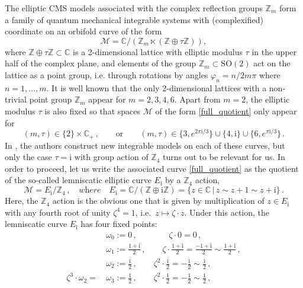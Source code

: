 \documentclass{article}
\def \om {\omega}
\def \Zs {\mathbb{Z}}
\def \Cs {\mathbb{C}}
\begin{document}
The elliptic CMS models associated with the complex reflection groups $\Zs_m$ form a family 
of quantum mechanical integrable systems with (complexified) coordinate on an orbifold 
curve of the form 
\begin{equation}
\mathcal{M} =  \Cs / \left(\Zs_m \ltimes (\Zs \oplus \tau \Zs)\right),
\label{full_quotient}
\end{equation}
where $\Zs \oplus \tau \Zs \subset \Cs$ is a 2-dimensional lattice with elliptic modulus 
$\tau$ in the upper half of the complex plane, and elements of the 
group $\Zs_m \subset \mathrm{SO}(2)$ act on the lattice as a point group, i.e. through 
rotations by angles $\varphi_n = n/2m\pi$ where $n=1,\dots,m$. It is well known that 
the only 2-dimensional lattices with a non-trivial point group $\mathbb{Z}_m$ appear 
for $m=2,3,4,6$. Apart from $m=2$, the elliptic modulus $\tau$ is also fixed so that 
spaces $\mathcal{M}$ of the form 
\eqref{full_quotient} only appear for 
\begin{equation}
(m,\tau) \in \{2\} \times \Cs_+\,, \qquad \mathrm{or} \qquad (m,\tau) \in 
\{3, e^{2 \pi \mathrm{i} /3}\} \cup \{4, \mathrm{i}\} \cup \{6, e^{\pi \mathrm{i} /3}\}\,. 
\end{equation}
In \cite{etingof2011107}, the authors construct new integrable models on each of these 
curves, but only the case $\tau = \mathrm{i}$ with group action of $\mathbb{Z}_4$ 
turns out to be relevant for us. In order to proceed, let us write the associated curve 
\eqref{full_quotient} as the quotient of the so-called lemniscatic elliptic curve 
$E_\mathrm{i}$ by a $\Zs_4$ action, 
\begin{equation}
\mathcal{M} = E_{\mathrm{i}}/\Zs_4\,, \quad \textit{where}\quad  E_{\mathrm{i}} = \Cs/(\Zs \oplus \mathrm{i} \Zs) 
= \{ z \in \Cs \,\vert\, z \sim z+1\sim z+\mathrm{i} \}\,.  
\end{equation}
Here, the $\Zs_4$ action is the obvious one that is given by multiplication of $z
\in E_{\mathrm{i}}$ with any fourth root of unity $\zeta^4 =1$, i.e.\ $z \mapsto \zeta \cdot z$. 
Under this action, the lemniscatic curve $E_\mathrm{i}$ has four fixed points:
\begin{align}
   & \om_0 := 0\,, \qquad \quad \,\,\,\,\, \zeta \cdot 0 = 0\,, \\
   & \om_1 := \frac{1+\mathrm{i}}{2}\,,\qquad \zeta \cdot \frac{1+\mathrm{i}}{2} = \frac{-1+\mathrm{i}}{2} \sim \frac{1+\mathrm{i}}{2}\,, \\
& \om_2 := \frac{\mathrm{i}}{2}\,, \qquad \zeta^2 \cdot \frac{\mathrm{i}}{2} = -\frac{\mathrm{i}}{2} \sim \frac{\mathrm{i}}{2}\, , \\
 \zeta^3 \cdot \om_2 =\, & \om_3 := \frac{1}{2}\,, \qquad \zeta^2 \cdot \frac{1}{2} = -\frac{1}{2} \sim \frac{1}{2}\, ,
\end{align}
\end{document}

